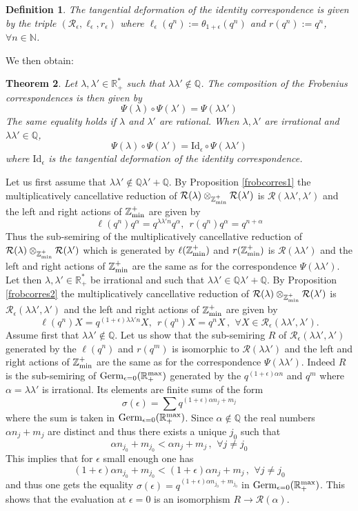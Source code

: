 \documentclass[noams,lp]{compositio}
\newtheorem{thm}{Theorem}[section] %
\newtheorem{defn}[thm]{Definition} %
\def\id{{\rm id}}
\def\N{{\mathbb N}}
\def\Q{{\mathbb Q}}
\def\R{{\mathbb R}}
\def\Z{{\mathbb Z}}
\def\cR{{\mathcal R}}
\def\qqq{\,,\,~\forall}
\def\zminp{\Z_{\rm min}^+}
\def\id{{\mbox{Id}}}
\def\mc{multiplicatively cancellative }
\def\rmax{\R_+^{\rm max}}
\def\beps{{\cR_\epsilon}}
\def\germ{{{\rm Germ}_{\epsilon=0}(\rmax)}}
\begin{document}
\begin{defn}\label{defndef} The tangential deformation of the identity correspondence is given by the triple $(\beps,\ell_\epsilon,r_\epsilon)$ where  $\ell_\epsilon(q^n):=\theta_{1+\epsilon}(q^n)$ and $r(q^n):=q^n$, $\forall n\in \N$.
\end{defn}
We then obtain:
\begin{thm}\label{thmcomp} Let $\lambda, \lambda' \in \R_+^*$ such that $\lambda\lambda'\notin \Q$. The composition of the Frobenius correspondences is then given by 
$$
\Psi(\lambda)\circ \Psi(\lambda')=\Psi(\lambda\lambda')
$$
The same equality holds if $\lambda$ and $\lambda'$ are rational. When  $\lambda, \lambda'$ are irrational and $\lambda\lambda'\in \Q$,
$$
\Psi(\lambda)\circ \Psi(\lambda')=\id_\epsilon\circ \Psi(\lambda\lambda')
$$
where $\id_\epsilon$ is the tangential deformation of the identity correspondence.
\end{thm}
\proof Let us first assume that $\lambda\lambda'\notin \Q\lambda'+\Q$. By Proposition \ref{frobcorres1} the \mc reduction of $\cR(\lambda)\otimes_{\zminp} \cR(\lambda')$ is $\cR(\lambda\lambda',\lambda')$ and the left and right actions of $\zminp$ are given by 
$$
\ell(q^n)q^\alpha=q^{\lambda\lambda'n}q^\alpha, \  \  r(q^n)q^\alpha=q^{n+\alpha}
$$
Thus the sub-semiring of the \mc reduction of $\cR(\lambda)\otimes_{\zminp} \cR(\lambda')$ which is generated by $\ell(\zminp)$ and $r(\zminp)$ is $\cR(\lambda\lambda')$ and the left and right actions of $\zminp$ are the same as for the correspondence $\Psi(\lambda\lambda')$.
 Let then  $\lambda, \lambda'\in \R_+^*$ be irrational and such that $\lambda\lambda'\in \Q\lambda'+\Q$.  By Proposition \ref{frobcorres2} the \mc reduction of $\cR(\lambda)\otimes_{\zminp} \cR(\lambda')$ is $\cR_\epsilon(\lambda\lambda',\lambda')$ and the left and right actions of $\zminp$ are given by 
$$
\ell(q^n)X=q^{(1+\epsilon)\lambda\lambda'n}X, \  \  r(q^n)X=q^{n}X \qqq X\in \cR_\epsilon(\lambda\lambda',\lambda').
$$
Assume first that $\lambda\lambda'\notin \Q$. Let us show that the sub-semiring $R$ of  $\cR_\epsilon(\lambda\lambda',\lambda')$ generated by the $\ell(q^n)$ and $r(q^m)$ is isomorphic to $\cR(\lambda\lambda')$ and the left and right actions of $\zminp$ are the same as for the correspondence $\Psi(\lambda\lambda')$. Indeed $R$ is the sub-semiring of $\germ$ generated by the $q^{(1+\epsilon)\alpha n}$ and $q^m$ where $\alpha=\lambda\lambda'$ is irrational. Its elements are finite sums  of the  form 
$$
\sigma(\epsilon)=\sum q^{(1+\epsilon)\alpha n_j+m_j}
$$ 
where the sum is taken in $\germ$. Since $\alpha\notin \Q$ the real numbers $\alpha n_j+m_j$ are distinct and thus there exists a unique $j_0$ such that 
$$
\alpha n_{j_0}+m_{j_0}<\alpha n_j+m_j \qqq j\neq j_0
$$
This implies that for $\epsilon$ small enough one has 
$$
(1+\epsilon)\alpha n_{j_0}+m_{j_0}<(1+\epsilon)\alpha n_j+m_j \qqq j\neq j_0
$$
and thus one gets the  equality $\sigma(\epsilon)=q^{(1+\epsilon)\alpha n_{j_0}+m_{j_0}}$ in $\germ$. This shows that the evaluation at $\epsilon=0$ is an isomorphism $R\to \cR(\alpha)$.
\end{document}
